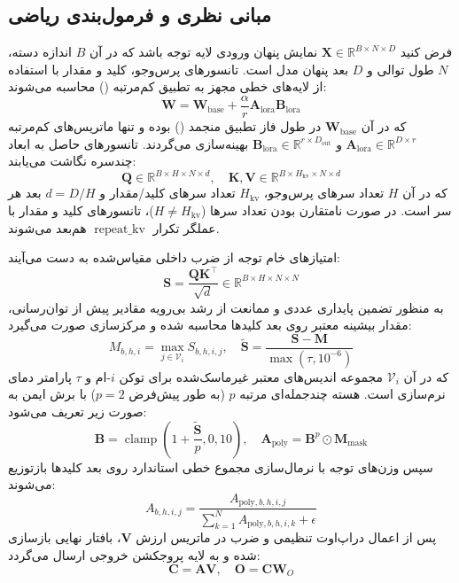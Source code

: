 \subsection{مبانی نظری و فرمول‌بندی ریاضی}
فرض کنید $\mathbf{X} \in \mathbb{R}^{B \times N \times D}$ نمایش پنهان ورودی لایه توجه باشد که در آن $B$ اندازه دسته، $N$ طول توالی و $D$ بعد پنهان مدل است. تانسورهای پرس‌وجو، کلید و مقدار با استفاده از لایه‌های خطی مجهز به تطبیق کم‌مرتبه () محاسبه می‌شوند:
\begin{equation}
\mathbf{W} = \mathbf{W}_{\text{base}} + \frac{\alpha}{r} \mathbf{A}_{\text{lora}} \mathbf{B}_{\text{lora}}
\end{equation}
که در آن $\mathbf{W}_{\text{base}}$ در طول فاز تطبیق منجمد () بوده و تنها ماتریس‌های کم‌مرتبه $\mathbf{A}_{\text{lora}} \in \mathbb{R}^{D \times r}$ و $\mathbf{B}_{\text{lora}} \in \mathbb{R}^{r \times D_{\text{out}}}$ بهینه‌سازی می‌گردند. تانسورهای حاصل به ابعاد چندسره نگاشت می‌یابند:
\begin{equation}
\mathbf{Q} \in \mathbb{R}^{B \times H \times N \times d}, \quad \mathbf{K}, \mathbf{V} \in \mathbb{R}^{B \times H_{\text{kv}} \times N \times d}
\end{equation}
که در آن $H$ تعداد سرهای پرس‌وجو، $H_{\text{kv}}$ تعداد سرهای کلید/مقدار و $d = D/H$ بعد هر سر است. در صورت نامتقارن بودن تعداد سرها ($H \ne H_{\text{kv}}$)، تانسورهای کلید و مقدار با عملگر تکرار $\operatorname{repeat\_kv}$ هم‌بعد می‌شوند.

امتیازهای خام توجه از ضرب داخلی مقیاس‌شده به دست می‌آیند:
\begin{equation}
\mathbf{S} = \frac{\mathbf{Q} \mathbf{K}^\top}{\sqrt{d}} \in \mathbb{R}^{B \times H \times N \times N}
\end{equation}
به منظور تضمین پایداری عددی و ممانعت از رشد بی‌رویه مقادیر پیش از توان‌رسانی، مقدار بیشینه معتبر روی بعد کلیدها محاسبه شده و مرکزسازی صورت می‌گیرد:
\begin{equation}
M_{b,h,i} = \max_{j \in \mathcal{V}_i} S_{b,h,i,j}, \quad \tilde{\mathbf{S}} = \frac{\mathbf{S} - \mathbf{M}}{\max(\tau, 10^{-6})}
\end{equation}
که در آن $\mathcal{V}_i$ مجموعه اندیس‌های معتبر غیرماسک‌شده برای توکن $i$-ام و $\tau$ پارامتر دمای نرم‌سازی است. هسته چندجمله‌ای مرتبه $p$ (به طور پیش‌فرض $p=2$) با برش ایمن به صورت زیر تعریف می‌شود:
\begin{equation}
\mathbf{B} = \operatorname{clamp}\left(1 + \frac{\tilde{\mathbf{S}}}{p}, 0, 10\right), \quad \mathbf{A}_{\text{poly}} = \mathbf{B}^p \odot \mathbf{M}_{\text{mask}}
\end{equation}
سپس وزن‌های توجه با نرمال‌سازی مجموع خطی استاندارد روی بعد کلیدها بازتوزیع می‌شوند:
\begin{equation}
A_{b,h,i,j} = \frac{A_{\text{poly},b,h,i,j}}{\sum_{k=1}^N A_{\text{poly},b,h,i,k} + \epsilon}
\end{equation}
پس از اعمال دراپ‌اوت تنظیمی و ضرب در ماتریس ارزش $\mathbf{V}$، بافتار نهایی بازسازی شده و به لایه پروجکشن خروجی ارسال می‌گردد:
\begin{equation}
\mathbf{C} = \mathbf{A} \mathbf{V}, \quad \mathbf{O} = \mathbf{C} \mathbf{W}_O
\end{equation}

